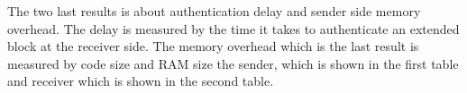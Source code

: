 \tiny

The two last results is about authentication delay and sender side memory overhead. The delay is measured by the time it takes to authenticate an extended block at the receiver side. The memory overhead which is the last result is measured by code size and RAM size  the sender, which is shown in the first table and receiver which is shown in the second table.